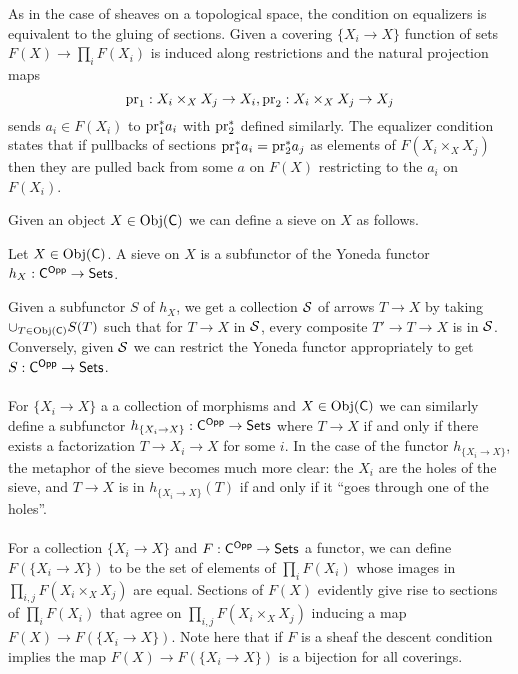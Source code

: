 \begin{remark}
    As in the case of sheaves on a topological space, the condition on equalizers is equivalent to the gluing of sections. Given a covering $\{X_{i}\to X\}$ function of sets $F(X)\to \prod_{i}F(X_{i})$ is induced along restrictions and the natural projection maps $$\mathrm{pr}_{1}:X_{i}\times_{X}X_{j}\to X_{i},\mathrm{pr}_{2}:X_{i}\times_{X}X_{j}\to X_{j}$$ sends $a_{i}\in F(X_{i})$ to $\mathrm{pr}_{1}^{*}a_{i}$ with $\mathrm{pr}_{2}^{*}$ defined similarly. The equalizer condition states that if pullbacks of sections $\mathrm{pr}_{1}^{*}a_{i}=\mathrm{pr}_{2}^{*}a_{j}$ as elements of $F(X_{i}\times_{X}X_{j})$ then they are pulled back from some $a$ on $F(X)$ restricting to the $a_{i}$ on $F(X_{i})$. 
\end{remark}
Given an object $X\in\mathrm{Obj}(\mathsf{C})$ we can define a sieve on $X$ as follows. 
\begin{definition}[Sieve]
    Let $X\in\mathrm{Obj}(\mathsf{C})$. A sieve on $X$ is a subfunctor of the Yoneda functor $h_{X}:\mathsf{C}^{\mathsf{Opp}}\to\mathsf{Sets}$.
\end{definition}
Given a subfunctor $S$ of $h_{X}$, we get a collection $\mathcal{S}$ of arrows $T\to X$ by taking $\cup_{T\in\mathrm{Obj}(\mathsf{C})}S(T)$ such that for $T\to X$ in $\mathcal{S}$, every composite $T'\to T\to X$ is in $\mathcal{S}$. Conversely, given $\mathcal{S}$ we can restrict the Yoneda functor appropriately to get $S:\mathsf{C}^{\mathsf{Opp}}\to\mathsf{Sets}$. 
\\\\
For $\{X_{i}\to X\}$ a a collection of morphisms and $X\in\mathrm{Obj}(\mathsf{C})$ we can similarly define a subfunctor $h_{\{X_{i}\to X\}}:\mathsf{C}^{\mathsf{Opp}}\to\mathsf{Sets}$ where $T\to X$ if and only if there exists a factorization $T\to X_{i}\to X$ for some $i$. In the case of the functor $h_{\{X_{i}\to X\}}$, the metaphor of the sieve becomes much more clear: the $X_{i}$ are the holes of the sieve, and $T\to X$ is in $h_{\{X_{i}\to X\}}(T)$ if and only if it ``goes through one of the holes''. 
\\\\
For a collection $\{X_{i}\to X\}$ and $F:\mathsf{C}^{\mathsf{Opp}}\to\mathsf{Sets}$ a functor, we can define $F(\{X_{i}\to X\})$ to be the set of elements of $\prod_{i}F(X_{i})$ whose images in $\prod_{i,j}F(X_{i}\times_{X}X_{j})$ are equal. Sections of $F(X)$ evidently give rise to sections of $\prod_{i}F(X_{i})$ that agree on $\prod_{i,j}F(X_{i}\times_{X}X_{j})$ inducing a map $F(X)\to F(\{X_{i}\to X\})$. Note here that if $F$ is a sheaf the descent condition implies the map $F(X)\to F(\{X_{i}\to X\})$ is a bijection for all coverings. 
\\\\
